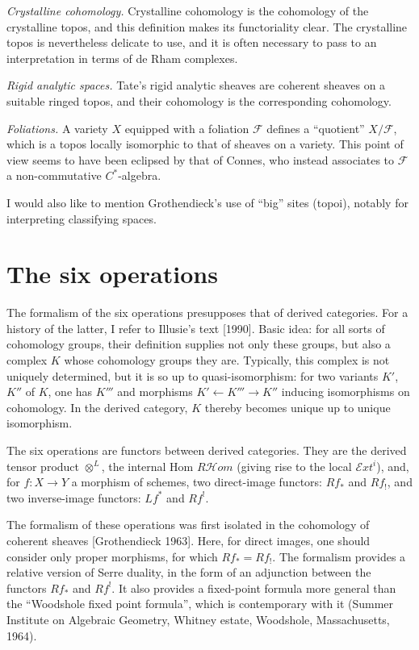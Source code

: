 \documentclass[11pt]{article}
\begin{document}
\begin{description}[leftmargin=2.6em,labelwidth=2em]
\item[(A)] \emph{Crystalline cohomology.} Crystalline cohomology is the cohomology of the crystalline topos, and this definition makes its functoriality clear. The crystalline topos is nevertheless delicate to use, and it is often necessary to pass to an interpretation in terms of de Rham complexes.
\item[(B)] \emph{Rigid analytic spaces.} Tate's rigid analytic sheaves are coherent sheaves on a suitable ringed topos, and their cohomology is the corresponding cohomology.
\item[(C)] \emph{Foliations.} A variety \(X\) equipped with a foliation \(\mathcal F\) defines a ``quotient'' \(X/\mathcal F\), which is a topos locally isomorphic to that of sheaves on a variety. This point of view seems to have been eclipsed by that of Connes, who instead associates to \(\mathcal F\) a non-commutative \(C^*\)-algebra.
\end{description}

I would also like to mention Grothendieck's use of ``big'' sites (topoi), notably for interpreting classifying spaces.

\section{The six operations}

The formalism of the six operations presupposes that of derived categories. For a history of the latter, I refer to Illusie's text [1990]. Basic idea: for all sorts of cohomology groups, their definition supplies not only these groups, but also a complex \(K\) whose cohomology groups they are. Typically, this complex is not uniquely determined, but it is so up to quasi-isomorphism: for two variants \(K'\), \(K''\) of \(K\), one has \(K'''\) and morphisms \(K'\leftarrow K'''\to K''\) inducing isomorphisms on cohomology. In the derived category, \(K\) thereby becomes unique up to unique isomorphism.

The six operations are functors between derived categories. They are the derived tensor product \(\otimes^L\), the internal Hom \(R\mathcal Hom\) (giving rise to the local \(\mathcal Ext^i\)), and, for \(f:X\to Y\) a morphism of schemes, two direct-image functors: \(Rf_*\) and \(Rf_!\), and two inverse-image functors: \(Lf^*\) and \(Rf^!\).

The formalism of these operations was first isolated in the cohomology of coherent sheaves [Grothendieck 1963]. Here, for direct images, one should consider only proper morphisms, for which \(Rf_* = Rf_!\). The formalism provides a relative version of Serre duality, in the form of an adjunction between the functors \(Rf_*\) and \(Rf^!\). It also provides a fixed-point formula more general than the ``Woodshole fixed point formula'', which is contemporary with it (Summer Institute on Algebraic Geometry, Whitney estate, Woodshole, Massachusetts, 1964).
\end{document}
